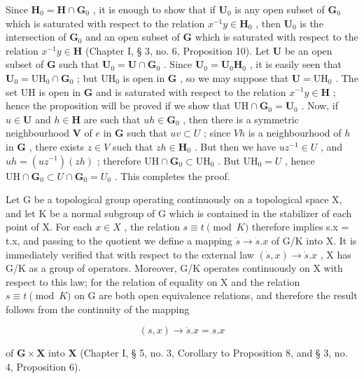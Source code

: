 Since \(\mathbf{H}_0 = \mathbf{H} \cap \mathbf{G}_0\) , it is enough to show that if \(\mathbf{U}_0\) is any open subset of \(\mathbf{G}_0\) which is saturated with respect to the relation \(x^{-1}y \in \mathbf{H}_0\) , then \(\mathbf{U}_0\) is the intersection of \(\mathbf{G}_0\) and an open subset of \(\mathbf{G}\) which is saturated with respect to the relation \(x^{-1}y \in \mathbf{H}\) (Chapter I, § 3, no. 6, Proposition 10). Let \(\mathbf{U}\) be an open subset of \(\mathbf{G}\) such that \(\mathbf{U}_0 = \mathbf{U} \cap \mathbf{G}_0\) . Since \(\mathbf{U}_0 = \mathbf{U}_0\mathbf{H}_0\) , it is easily seen that \(\mathbf{U}_0 = \mathrm{UH}_0 \cap \mathbf{G}_0\) ; but \(\mathrm{UH}_0\) is open in \(\mathbf{G}\) , so we may suppose that \(\mathbf{U} = \mathrm{UH}_0\) . The set \(\mathrm{UH}\) is open in \(\mathbf{G}\) and is saturated with respect to the relation \(x^{-1}y \in \mathbf{H}\) ; hence the proposition will be proved if we show that \(\mathrm{UH} \cap \mathbf{G}_0 = \mathbf{U}_0\) . Now, if \(u \in \mathbf{U}\) and \(h \in \mathbf{H}\) are such that \(uh \in \mathbf{G}_0\) , then there is a symmetric neighbourhood \(\mathbf{V}\) of \(e\) in \(\mathbf{G}\) such that \(uv \subset U\) ; since \(Vh\) is a neighbourhood of \(h\) in \(\mathbf{G}\) , there exists \(z \in V\) such that \(zh \in \mathbf{H}_0\) . But then we have \(uz^{-1} \in U\) , and \(uh = (uz^{-1})(zh)\) ; therefore \(\mathrm{UH} \cap \mathbf{G}_0 \subset \mathrm{UH}_0\) . But \(\mathrm{UH}_0 = U\) , hence \(\mathrm{UH} \cap \mathbf{G}_0 \subset U \cap \mathbf{G}_0 = U_0\) . This completes the proof.

Let G be a topological group operating continuously on a topological space X, and let K be a normal subgroup of G which is contained in the stabilizer of each point of X. For each \(x \in X\) , the relation \(s \equiv t \pmod{K}\) therefore implies s.x = t.x, and passing to the quotient we define a mapping \(\dot{s} \to \dot{s}.x\) of G/K into X. It is immediately verified that with respect to the external law \((\dot{s}, x) \to \dot{s}.x\) , X has G/K as a group of operators. Moreover, G/K operates continuously on X with respect to this law; for the relation of equality on X and the relation \(s \equiv t \pmod{K}\) on G are both open equivalence relations, and therefore the result follows from the continuity of the mapping

\[
(s, x) \rightarrow \dot {s}. x = s. x
\]

of \(\mathbf{G} \times \mathbf{X}\) into \(\mathbf{X}\) (Chapter I, § 5, no. 3, Corollary to Proposition 8, and § 3, no. 4, Proposition 6).

